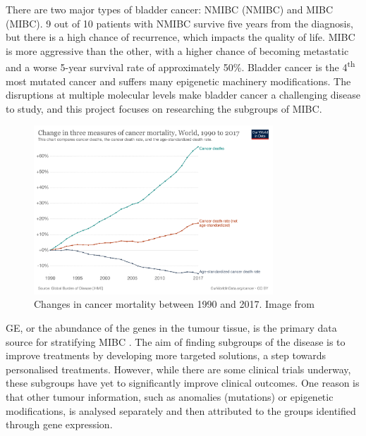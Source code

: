 There are two major types of bladder cancer: \gls{NMIBC} (NMIBC) and \gls{MIBC} (MIBC). 9 out of 10 patients with NMIBC survive five years from the diagnosis, but there is a high chance of recurrence, which impacts the quality of life. MIBC is more aggressive than the other, with a higher chance of becoming metastatic and a worse 5-year survival rate of approximately 50\%. Bladder cancer is the 4\textsuperscript{th} most mutated cancer and suffers many epigenetic machinery modifications. The disruptions at multiple molecular levels make bladder cancer a challenging disease to study, and this project focuses on researching the subgroups of \acrlong{MIBC}.



\begin{figure}[!t]
    \centering
    \includegraphics[width=0.8\textwidth,keepaspectratio]{Images/cancer-deaths-rate-and-age-standardized-rate-index.png}
    \caption[Cancer mortality]{Changes in cancer mortality between 1990 and 2017. Image from \citep{Roser2015-qb}}
    \label{fig:cancer_death}
\end{figure}

\gls{GE}, or the abundance of the genes in the tumour tissue, is the primary data source for stratifying MIBC \citep{Kamoun2020-tj,Robertson2017-mg,Marzouka2018-ge}. The aim of finding subgroups of the disease is to improve treatments by developing more targeted solutions, a step towards personalised treatments. However, while there are some clinical trials \citep{Griffin2024-zr} underway, these subgroups have yet to significantly improve clinical outcomes. One reason is that other tumour information, such as anomalies (mutations) or epigenetic modifications, is analysed separately and then attributed to the groups identified through gene expression.

